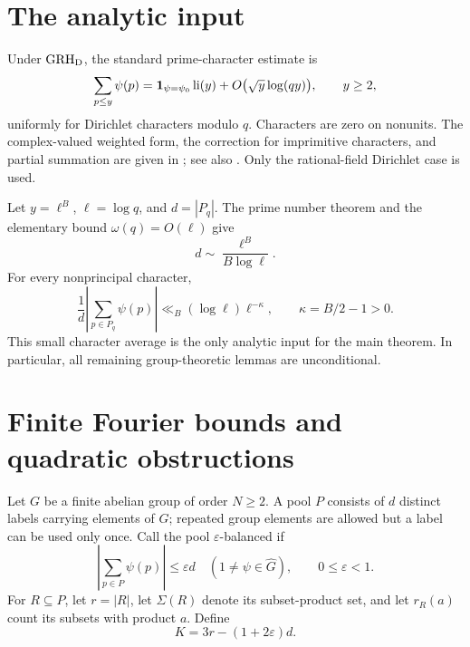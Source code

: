 \documentclass[11pt,a4paper]{article}
\theoremstyle{definition}
\theoremstyle{remark}
\begin{document}
\section{The analytic input}
Under $\mathrm{GRH}_{\mathrm D}$, the standard prime-character estimate is
\begin{equation}\label{p-eq:prime-character}
 \sum_{p\le y}\psi(p)
 =\mathbf 1_{\psi=\psi_0}\operatorname{li}(y)
  +O\bigl(\sqrt y\log(qy)\bigr),\qquad y\ge2,
\end{equation}
uniformly for Dirichlet characters modulo $q$. Characters are zero on
nonunits. The complex-valued weighted form, the correction for
imprimitive characters, and partial summation are given in
\cite[Section 2, equation (2.6)]{p-JMV}; see also
\cite[Theorem 13.7]{p-MV}. Only the rational-field Dirichlet case is used.

Let $y=\ell^B$, $\ell=\log q$, and $d=|P_q|$. The prime number theorem
and the elementary bound $\omega(q)=O(\ell)$ give
\begin{equation}\label{p-eq:d-asymptotic}
 d\sim\frac{\ell^B}{B\log\ell}.
\end{equation}
For every nonprincipal character,
\begin{equation}\label{p-eq:prime-bias}
 \frac1d\left|\sum_{p\in P_q}\psi(p)\right|
 \ll_B(\log\ell)\ell^{-\kappa},\qquad \kappa=B/2-1>0.
\end{equation}
This small character average is the only analytic input for the main
theorem. In particular, all remaining group-theoretic lemmas are
unconditional.



\section{Finite Fourier bounds and quadratic obstructions}\label{p-sec:inverse}
Let $G$ be a finite abelian group of order $N\ge2$. A pool $P$ consists
of $d$ distinct labels carrying elements of $G$; repeated group elements
are allowed but a label can be used only once. Call the pool
$\varepsilon$-balanced if
\begin{equation}\label{p-eq:inverse-bias}
 \left|\sum_{p\in P}\psi(p)\right|\le\varepsilon d
 \quad(1\ne\psi\in\widehat G),\qquad 0\le\varepsilon<1.
\end{equation}
For $R\subseteq P$, let $r=|R|$, let $\Sigma(R)$ denote its subset-product
set, and let $r_R(a)$ count its subsets with product $a$. Define
\[
 K=3r-(1+2\varepsilon)d.
\]
\end{document}
